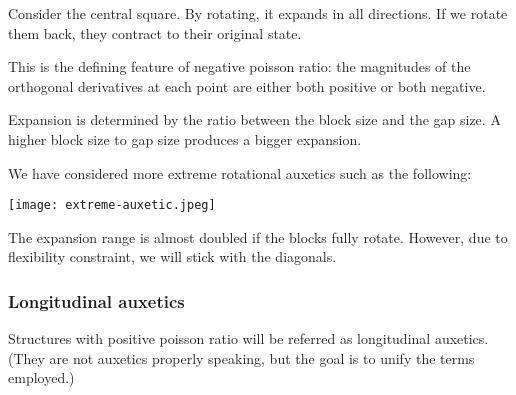 \documentclass{article}
\begin{document}

\vspace{5mm}

Consider the central square. By rotating, it expands in all directions. If we rotate them back, they contract to their original state.

This is the defining feature of negative poisson ratio: the magnitudes of the orthogonal derivatives at each point are either both positive or both negative.

Expansion is determined by the ratio between the block size and the gap size. A higher block size to gap size produces a bigger expansion.

We have considered more extreme rotational auxetics such as the following:

\texttt{[image: extreme-auxetic.jpeg]}

\vspace{5mm}

The expansion range is almost doubled if the blocks fully rotate. However, due to flexibility constraint, we will stick with the diagonals.

\subsubsection{Longitudinal auxetics}
Structures with positive poisson ratio will be referred as longitudinal auxetics. (They are not auxetics properly speaking, but the goal is to unify the terms employed.)
\end{document}
